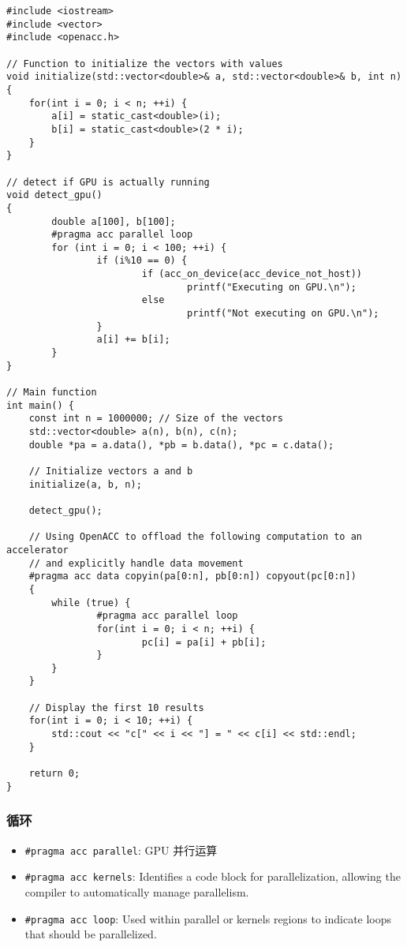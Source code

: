 \begin{lstlisting}[language=none,caption=test1.cpp]
#include <iostream>
#include <vector>
#include <openacc.h>

// Function to initialize the vectors with values
void initialize(std::vector<double>& a, std::vector<double>& b, int n) {
    for(int i = 0; i < n; ++i) {
        a[i] = static_cast<double>(i);
        b[i] = static_cast<double>(2 * i);
    }
}

// detect if GPU is actually running
void detect_gpu()
{
        double a[100], b[100];
        #pragma acc parallel loop
        for (int i = 0; i < 100; ++i) {
                if (i%10 == 0) {
                        if (acc_on_device(acc_device_not_host))
                                printf("Executing on GPU.\n");
                        else
                                printf("Not executing on GPU.\n");
                }
                a[i] += b[i];
        }
}

// Main function
int main() {
    const int n = 1000000; // Size of the vectors
    std::vector<double> a(n), b(n), c(n);
    double *pa = a.data(), *pb = b.data(), *pc = c.data();

    // Initialize vectors a and b
    initialize(a, b, n);

    detect_gpu();

    // Using OpenACC to offload the following computation to an accelerator
    // and explicitly handle data movement
    #pragma acc data copyin(pa[0:n], pb[0:n]) copyout(pc[0:n])
    {
        while (true) {
                #pragma acc parallel loop
                for(int i = 0; i < n; ++i) {
                        pc[i] = pa[i] + pb[i];
                }
        }
    }

    // Display the first 10 results
    for(int i = 0; i < 10; ++i) {
        std::cout << "c[" << i << "] = " << c[i] << std::endl;
    }

    return 0;
}
\end{lstlisting}

\subsubsection{循环}
\begin{itemize}
\item \verb`#pragma acc parallel`: GPU 并行运算
\item \verb`#pragma acc kernels`: Identifies a code block for parallelization, allowing the compiler to automatically manage parallelism.
\item \verb`#pragma acc loop`: Used within parallel or kernels regions to indicate loops that should be parallelized.
\end{itemize}

